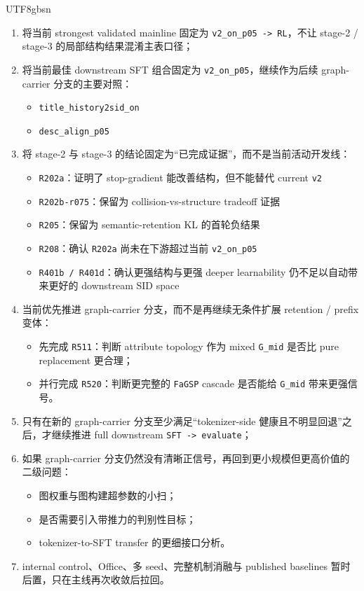 \documentclass[11pt]{article}
\begin{document}
\begin{CJK*}{UTF8}{gbsn}
\begin{enumerate}
  \item 将当前 strongest validated mainline 固定为 \texttt{v2\_on\_p05 -> RL}，不让 stage-2 / stage-3 的局部结构结果混淆主表口径；
  \item 将当前最佳 downstream SFT 组合固定为 \texttt{v2\_on\_p05}，继续作为后续 graph-carrier 分支的主要对照：
  \begin{itemize}
    \item \texttt{title\_history2sid\_on}
    \item \texttt{desc\_align\_p05}
  \end{itemize}
  \item 将 stage-2 与 stage-3 的结论固定为“已完成证据”，而不是当前活动开发线：
  \begin{itemize}
    \item \texttt{R202a}：证明了 stop-gradient 能改善结构，但不能替代 current \texttt{v2}
    \item \texttt{R202b-r075}：保留为 collision-vs-structure tradeoff 证据
    \item \texttt{R205}：保留为 semantic-retention KL 的首轮负结果
    \item \texttt{R208}：确认 \texttt{R202a} 尚未在下游超过当前 \texttt{v2\_on\_p05}
    \item \texttt{R401b / R401d}：确认更强结构与更强 deeper learnability 仍不足以自动带来更好的 downstream SID space
  \end{itemize}
  \item 当前优先推进 graph-carrier 分支，而不是再继续无条件扩展 retention / prefix 变体：
  \begin{itemize}
    \item 先完成 \texttt{R511}：判断 attribute topology 作为 mixed \texttt{G\_mid} 是否比 pure replacement 更合理；
    \item 并行完成 \texttt{R520}：判断更完整的 \texttt{FaGSP} cascade 是否能给 \texttt{G\_mid} 带来更强信号。
  \end{itemize}
  \item 只有在新的 graph-carrier 分支至少满足“tokenizer-side 健康且不明显回退”之后，才继续推进 full downstream \texttt{SFT -> evaluate}；
  \item 如果 graph-carrier 分支仍然没有清晰正信号，再回到更小规模但更高价值的二级问题：
  \begin{itemize}
    \item 图权重与图构建超参数的小扫；
    \item 是否需要引入带推力的判别性目标；
    \item tokenizer-to-SFT transfer 的更细接口分析。
  \end{itemize}
  \item internal control、Office、多 seed、完整机制消融与 published baselines 暂时后置，只在主线再次收敛后拉回。
\end{enumerate}


\end{CJK*}
\end{document}
